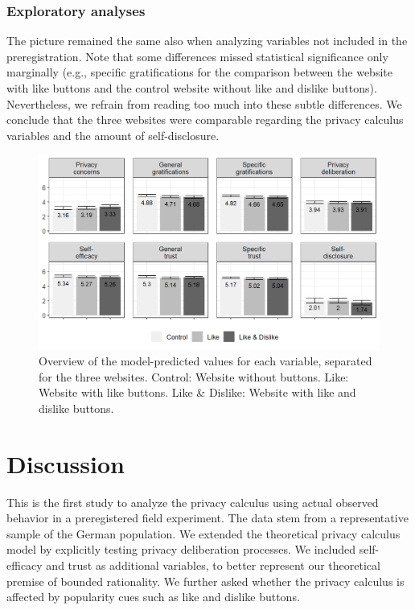 \documentclass[
  english,
  man,floatsintext]{apa6}
\begin{document}
\hypertarget{exploratory-analyses-1}{%
\subsubsection{Exploratory analyses}\label{exploratory-analyses-1}}

The picture remained the same also when analyzing variables not included in the preregistration.
Note that some differences missed statistical significance only marginally (e.g., specific gratifications for the comparison between the website with like buttons and the control website without like and dislike buttons).
Nevertheless, we refrain from reading too much into these subtle differences.
We conclude that the three websites were comparable regarding the privacy calculus variables and the amount of self-disclosure.

\begin{figure}[!h]
\includegraphics[width=\textwidth]{figures/results/bar_plot} \caption{Overview of the model-predicted values for each variable, separated for the three websites. Control: Website without buttons. Like: Website with like buttons. Like \& Dislike: Website with like and dislike buttons.}\label{fig:popularitycues}
\end{figure}

\hypertarget{discussion}{%
\section{Discussion}\label{discussion}}

This is the first study to analyze the privacy calculus using actual observed behavior in a preregistered field experiment.
The data stem from a representative sample of the German population.
We extended the theoretical privacy calculus model by explicitly testing privacy deliberation processes.
We included self-efficacy and trust as additional variables, to better represent our theoretical premise of bounded rationality.
We further asked whether the privacy calculus is affected by popularity cues such as like and dislike buttons.
\end{document}
